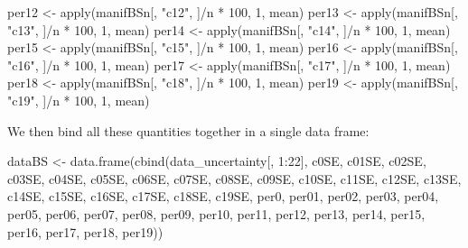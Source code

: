 \documentclass[
]{book}
\newenvironment{Shaded}{\begin{snugshade}}{\end{snugshade}}
\newcommand{\DecValTok}[1]{\textcolor[rgb]{0.00,0.00,0.81}{#1}}
\newcommand{\FunctionTok}[1]{\textcolor[rgb]{0.00,0.00,0.00}{#1}}
\newcommand{\NormalTok}[1]{#1}
\newcommand{\OtherTok}[1]{\textcolor[rgb]{0.56,0.35,0.01}{#1}}
\newcommand{\SpecialCharTok}[1]{\textcolor[rgb]{0.00,0.00,0.00}{#1}}
\newcommand{\StringTok}[1]{\textcolor[rgb]{0.31,0.60,0.02}{#1}}
\begin{document}
\begin{Shaded}
\begin{Highlighting}[]
\NormalTok{per12 }\OtherTok{\textless{}{-}} \FunctionTok{apply}\NormalTok{(manifBSn[, }\StringTok{"c12"}\NormalTok{, ]}\SpecialCharTok{/}\NormalTok{n }\SpecialCharTok{*} \DecValTok{100}\NormalTok{, }\DecValTok{1}\NormalTok{, mean)}
\NormalTok{per13 }\OtherTok{\textless{}{-}} \FunctionTok{apply}\NormalTok{(manifBSn[, }\StringTok{"c13"}\NormalTok{, ]}\SpecialCharTok{/}\NormalTok{n }\SpecialCharTok{*} \DecValTok{100}\NormalTok{, }\DecValTok{1}\NormalTok{, mean)}
\NormalTok{per14 }\OtherTok{\textless{}{-}} \FunctionTok{apply}\NormalTok{(manifBSn[, }\StringTok{"c14"}\NormalTok{, ]}\SpecialCharTok{/}\NormalTok{n }\SpecialCharTok{*} \DecValTok{100}\NormalTok{, }\DecValTok{1}\NormalTok{, mean)}
\NormalTok{per15 }\OtherTok{\textless{}{-}} \FunctionTok{apply}\NormalTok{(manifBSn[, }\StringTok{"c15"}\NormalTok{, ]}\SpecialCharTok{/}\NormalTok{n }\SpecialCharTok{*} \DecValTok{100}\NormalTok{, }\DecValTok{1}\NormalTok{, mean)}
\NormalTok{per16 }\OtherTok{\textless{}{-}} \FunctionTok{apply}\NormalTok{(manifBSn[, }\StringTok{"c16"}\NormalTok{, ]}\SpecialCharTok{/}\NormalTok{n }\SpecialCharTok{*} \DecValTok{100}\NormalTok{, }\DecValTok{1}\NormalTok{, mean)}
\NormalTok{per17 }\OtherTok{\textless{}{-}} \FunctionTok{apply}\NormalTok{(manifBSn[, }\StringTok{"c17"}\NormalTok{, ]}\SpecialCharTok{/}\NormalTok{n }\SpecialCharTok{*} \DecValTok{100}\NormalTok{, }\DecValTok{1}\NormalTok{, mean)}
\NormalTok{per18 }\OtherTok{\textless{}{-}} \FunctionTok{apply}\NormalTok{(manifBSn[, }\StringTok{"c18"}\NormalTok{, ]}\SpecialCharTok{/}\NormalTok{n }\SpecialCharTok{*} \DecValTok{100}\NormalTok{, }\DecValTok{1}\NormalTok{, mean)}
\NormalTok{per19 }\OtherTok{\textless{}{-}} \FunctionTok{apply}\NormalTok{(manifBSn[, }\StringTok{"c19"}\NormalTok{, ]}\SpecialCharTok{/}\NormalTok{n }\SpecialCharTok{*} \DecValTok{100}\NormalTok{, }\DecValTok{1}\NormalTok{, mean)}
\end{Highlighting}
\end{Shaded}

We then bind all these quantities together in a single data frame:

\begin{Shaded}
\begin{Highlighting}[]
\NormalTok{dataBS }\OtherTok{\textless{}{-}} \FunctionTok{data.frame}\NormalTok{(}\FunctionTok{cbind}\NormalTok{(data\_uncertainty[, }\DecValTok{1}\SpecialCharTok{:}\DecValTok{22}\NormalTok{], c0SE, c01SE,}
\NormalTok{    c02SE, c03SE, c04SE, c05SE, c06SE, c07SE, c08SE, c09SE, c10SE,}
\NormalTok{    c11SE, c12SE, c13SE, c14SE, c15SE, c16SE, c17SE, c18SE, c19SE,}
\NormalTok{    per0, per01, per02, per03, per04, per05, per06, per07, per08,}
\NormalTok{    per09, per10, per11, per12, per13, per14, per15, per16, per17,}
\NormalTok{    per18, per19))}
\end{Highlighting}
\end{Shaded}
\end{document}

